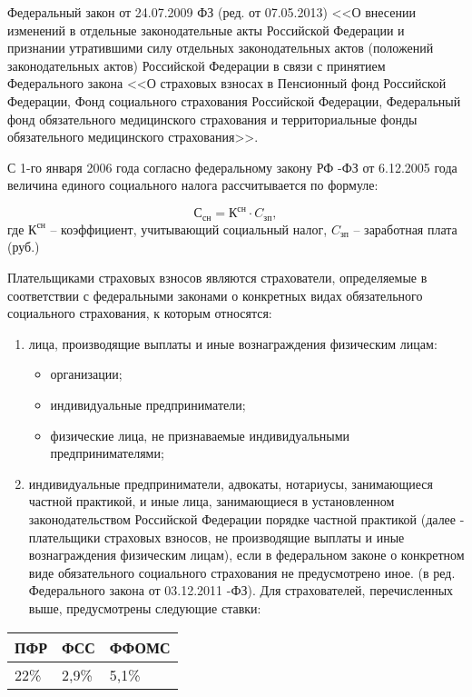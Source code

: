 Федеральный закон от 24.07.2009  ФЗ (ред. от 07.05.2013) <<О внесении изменений в отдельные законодательные акты Российской Федерации и признании утратившими силу отдельных законодательных актов (положений законодательных актов) Российской Федерации в связи с принятием Федерального закона <<О страховых взносах в Пенсионный фонд Российской Федерации, Фонд социального страхования Российской Федерации, Федеральный фонд обязательного медицинского страхования и территориальные фонды обязательного медицинского страхования>>.

С 1-го января 2006 года согласно федеральному закону РФ -ФЗ от 6.12.2005 года величина единого социального налога рассчитывается по формуле:

$$ С_{сн}=К^{сн} \cdot C_{зп},$$
где $К^{сн}$ – коэффициент, учитывающий социальный налог, $C_{зп}$ – заработная плата (руб.)

Плательщиками страховых взносов являются страхователи, определяемые в соответствии с федеральными законами о конкретных видах обязательного социального страхования, к которым относятся:
\begin{enumerate}
\item лица, производящие выплаты и иные вознаграждения физическим лицам: 
\begin{itemize}
\item организации;
\item индивидуальные предприниматели;
\item физические лица, не признаваемые индивидуальными предпринимателями;
\end{itemize}
\item индивидуальные предприниматели, адвокаты, нотариусы, занимающиеся частной практикой, и иные лица, занимающиеся в установленном законодательством Российской Федерации порядке частной практикой (далее - плательщики страховых взносов, не производящие выплаты и иные вознаграждения физическим лицам), если в федеральном законе о конкретном виде обязательного социального страхования не предусмотрено иное.
(в ред. Федерального закона от 03.12.2011 -ФЗ).
Для страхователей, перечисленных выше, предусмотрены следующие ставки:
\end{enumerate}
\begin{table}[!htb]
    \centering
        \begin{tabular}{|l|l|l|}
        		\hline
        		ПФР & ФСС & ФФОМС \\
        		\hline
        		22\% & 2,9\% & 5,1\% \\
        		\hline
        \end{tabular}   		
\end{table}

